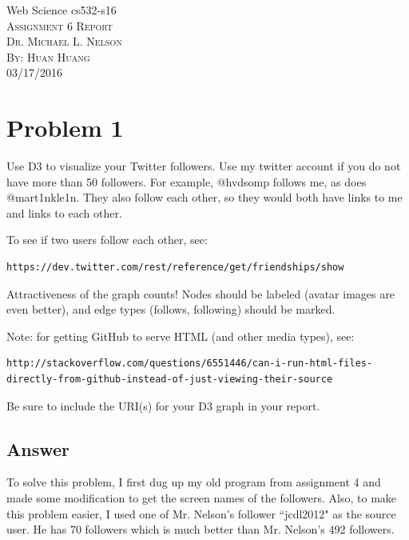 \documentclass[12pt]{article}
\begin{document}
\begin{titlepage}
	\begin{center}
	\Huge{Web Science cs532-s16}\\
	[0.25in]
	\textsc{\Large Assignment 6 Report}\\
	\textsc{\normalsize Dr. Michael L. Nelson}\\
	[4.25in]
	\textsc{\normalsize By: Huan Huang}\\
	\large 03/17/2016\\
	
	
	\end{center}
\end{titlepage}
\newpage


\section*{Problem 1}

Use D3 to visualize your Twitter followers.  Use my twitter account
if you do not have more than 50 followers.  For example,
@hvdsomp follows me, as does @mart1nkle1n.  They also follow each
other, so they would both have links to me and links to each other.

\noindent
To see if two users follow each other, see:
\begin{verbatim}
https://dev.twitter.com/rest/reference/get/friendships/show
\end{verbatim}

Attractiveness of the graph counts!  Nodes should be labeled (avatar
images are even better), and edge types (follows, following) should
be marked.

\noindent
Note: for getting GitHub to serve HTML (and other media types), see:
\begin{verbatim}
http://stackoverflow.com/questions/6551446/can-i-run-html-files-directly-from-github-instead-of-just-viewing-their-source
\end{verbatim}

\noindent
Be sure to include the URI(s) for your D3 graph in your report. 

\subsection*{Answer}
To solve this problem, I first dug up my old program from assignment 4 and made some modification to get the screen names of the followers. Also, to make this problem easier, I used one of Mr. Nelson's follower ``jcdl2012" as the source user. He has 70 followers which is much better than Mr. Nelson's 492 followers. 
\end{document}
